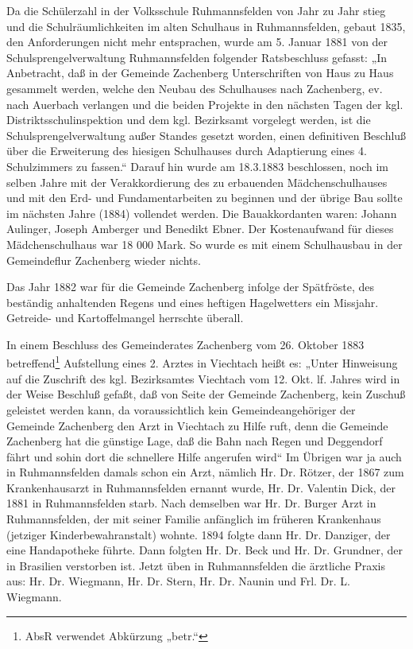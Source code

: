 \documentclass{book}
\begin{document}
Da die Schülerzahl in der Volksschule Ruhmannsfelden von Jahr zu Jahr
stieg und die Schulräumlichkeiten im alten Schulhaus in Ruhmannsfelden,
gebaut 1835, den Anforderungen nicht mehr entsprachen, wurde am 5.
Januar 1881 von der Schulsprengelverwaltung Ruhmannsfelden folgender
Ratsbeschluss gefasst: „In Anbetracht, daß in der Gemeinde Zachenberg
Unterschriften von Haus zu Haus gesammelt werden, welche den Neubau des
Schulhauses nach Zachenberg, ev. nach Auerbach verlangen und die beiden
Projekte in den nächsten Tagen der kgl. Distriktsschulinspektion und dem
kgl. Bezirksamt vorgelegt werden, ist die Schulsprengelverwaltung außer
Standes gesetzt worden, einen definitiven Beschluß über die Erweiterung
des hiesigen Schulhauses durch Adaptierung eines 4. Schulzimmers zu
fassen.“ Darauf hin wurde am 18.3.1883 beschlossen, noch im selben Jahre
mit der Verakkordierung des zu erbauenden Mädchenschulhauses und mit den
Erd- und Fundamentarbeiten zu beginnen und der übrige Bau sollte im
nächsten Jahre (1884) vollendet werden. Die Bauakkordanten waren: Johann
Aulinger, Joseph Amberger und Benedikt Ebner. Der Kostenaufwand für
dieses Mädchenschulhaus war 18 000 Mark. So wurde es mit einem
Schulhausbau in der Gemeindeflur Zachenberg wieder nichts.

Das Jahr 1882 war für die Gemeinde Zachenberg infolge der Spätfröste,
des beständig anhaltenden Regens und eines heftigen Hagelwetters ein
Missjahr. Getreide- und Kartoffelmangel herrschte überall.

In einem Beschluss des Gemeinderates Zachenberg vom 26. Oktober 1883
betreffend\footnote{AbsR verwendet Abkürzung „betr.“} Aufstellung eines
2. Arztes in Viechtach heißt es: „Unter Hinweisung auf die Zuschrift des
kgl. Bezirksamtes Viechtach vom 12. Okt. lf. Jahres wird in der Weise
Beschluß gefaßt, daß von Seite der Gemeinde Zachenberg, kein Zuschuß
geleistet werden kann, da voraussichtlich kein Gemeindeangehöriger der
Gemeinde Zachenberg den Arzt in Viechtach zu Hilfe ruft, denn die
Gemeinde Zachenberg hat die günstige Lage, daß die Bahn nach Regen und
Deggendorf fährt und sohin dort die schnellere Hilfe angerufen wird“ Im
Übrigen war ja auch in Ruhmannsfelden damals schon ein Arzt, nämlich Hr.
Dr. Rötzer, der 1867 zum Krankenhausarzt in Ruhmannsfelden ernannt
wurde, Hr. Dr. Valentin Dick, der 1881 in Ruhmannsfelden starb. Nach
demselben war Hr. Dr. Burger Arzt in Ruhmannsfelden, der mit seiner
Familie anfänglich im früheren Krankenhaus (jetziger
Kinderbewahranstalt) wohnte. 1894 folgte dann Hr. Dr. Danziger, der eine
Handapotheke führte. Dann folgten Hr. Dr. Beck und Hr. Dr. Grundner, der
in Brasilien verstorben ist. Jetzt üben in Ruhmannsfelden die ärztliche
Praxis aus: Hr. Dr. Wiegmann, Hr. Dr. Stern, Hr. Dr. Naunin und Frl. Dr.
L. Wiegmann.
\end{document}
